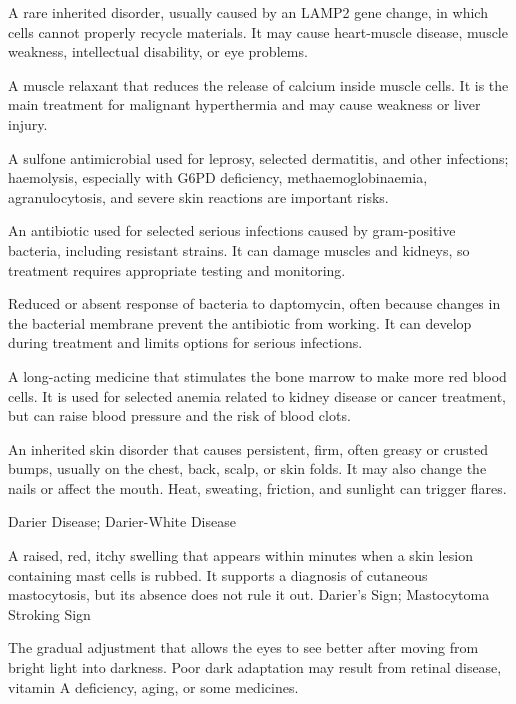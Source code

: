  A rare inherited disorder, usually caused by an LAMP2 gene change, in which cells cannot properly recycle materials. It may cause heart-muscle disease, muscle weakness, intellectual disability, or eye problems.

 A muscle relaxant that reduces the release of calcium inside muscle cells. It is the main treatment for malignant hyperthermia and may cause weakness or liver injury.

 A sulfone antimicrobial used for leprosy, selected dermatitis, and other infections; haemolysis, especially with G6PD deficiency, methaemoglobinaemia, agranulocytosis, and severe skin reactions are important risks.

 An antibiotic used for selected serious infections caused by gram-positive bacteria, including resistant strains. It can damage muscles and kidneys, so treatment requires appropriate testing and monitoring.

 Reduced or absent response of bacteria to daptomycin, often because changes in the bacterial membrane prevent the antibiotic from working. It can develop during treatment and limits options for serious infections.

 A long-acting medicine that stimulates the bone marrow to make more red blood cells. It is used for selected anemia related to kidney disease or cancer treatment, but can raise blood pressure and the risk of blood clots.

 An inherited skin disorder that causes persistent, firm, often greasy or crusted bumps, usually on the chest, back, scalp, or skin folds. It may also change the nails or affect the mouth. Heat, sweating, friction, and sunlight can trigger flares.

\synonyms
Darier Disease; Darier-White Disease

 A raised, red, itchy swelling that appears within minutes when a skin lesion containing mast cells is rubbed. It supports a diagnosis of cutaneous mastocytosis, but its absence does not rule it out.
\synonyms
Darier's Sign; Mastocytoma Stroking Sign

 The gradual adjustment that allows the eyes to see better after moving from bright light into darkness. Poor dark adaptation may result from retinal disease, vitamin A deficiency, aging, or some medicines.


